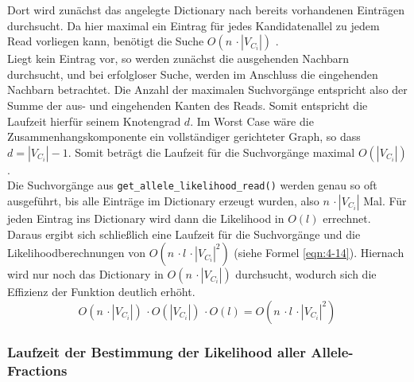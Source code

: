 Dort wird zunächst das angelegte Dictionary nach bereits vorhandenen Einträgen durchsucht. Da hier maximal ein Eintrag für jedes Kandidatenallel zu jedem Read vorliegen kann, benötigt die Suche $ O(n \,\cdotp |V_{C_{i}}|) $ \cite{python-sort}. \\

Liegt kein Eintrag vor, so werden zunächst die ausgehenden Nachbarn durchsucht, und bei erfolgloser Suche, werden im Anschluss die eingehenden Nachbarn betrachtet. Die Anzahl der maximalen Suchvorgänge entspricht also der Summe der aus- und eingehenden Kanten des Reads. Somit entspricht die Laufzeit hierfür seinem Knotengrad $d$. Im Worst Case wäre die Zusammenhangskomponente ein vollständiger gerichteter Graph, so dass $ d = |V_{C_{i}}| - 1 $. Somit beträgt die Laufzeit für die Suchvorgänge maximal $O(|V_{C_{i}}|)$.\\

Die Suchvorgänge aus \lstinline|get_allele_likelihood_read()| werden genau so oft ausgeführt, bis alle Einträge im Dictionary erzeugt wurden, also $n \,\cdotp |V_{C_{i}}|$ Mal. Für jeden Eintrag ins Dictionary wird dann die Likelihood in $ O(l) $ errechnet. Daraus ergibt sich schließlich eine Laufzeit für die Suchvorgänge und die Likelihoodberechnungen von $ O(n \,\cdotp l \,\cdotp |V_{C_{i}}|^2)$ (siehe Formel \eqref{eqn:4-14}). Hiernach wird nur noch das Dictionary in $ O(n \,\cdotp |V_{C_{i}}|) $ durchsucht, wodurch sich die Effizienz der Funktion deutlich erhöht.
\begin{equation} \label{eqn:4-14}
\tag{4-14}
O(n \,\cdotp |V_{C_{i}}|) \,\cdotp O(|V_{C_{i}}|) \,\cdotp O(l) = O(n \,\cdotp l \,\cdotp |V_{C_{i}}|^2)
\end{equation}

\subsubsection{Laufzeit der Bestimmung der Likelihood aller Allele-Fractions} \label{subsubsec:complex-max-al-lh}

